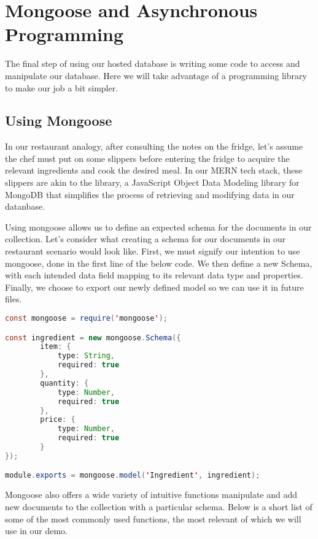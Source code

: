 \section{Mongoose and Asynchronous Programming}

The final step of using our hosted database is writing some code to access and manipulate our database. Here we will take advantage of a programming library to make our job a bit simpler. 

\subsection*{Using Mongoose}

In our restaurant analogy, after consulting the notes on the fridge, let's assume the chef must put on some slippers before entering the fridge to acquire the relevant ingredients and cook the desired meal. In our MERN tech stack, these slippers are akin to the  library, a JavaScript Object Data Modeling library for MongoDB that simplifies the process of retrieving and modifying data in our datanbase. 

Using mongoose allows us to define an expected schema for the documents in our collection. Let's consider what creating a schema for our documents in our restaurant scenario would look like. First, we must signify our intention to use mongoose, done in the first line of the below code. We then define a new Schema, with each intended data field mapping to its relevant data type and properties. Finally, we choose to export our newly defined model so we can use it in future files.

\vspace{.5cm}

\begin{lstlisting}[language=Java]
const mongoose = require('mongoose');

const ingredient = new mongoose.Schema({
        item: {
            type: String,
            required: true
        },
        quantity: {
            type: Number,
            required: true
        },
        price: {
            type: Number,
            required: true
        }
});

module.exports = mongoose.model('Ingredient', ingredient);
\end{lstlisting}

Mongoose also offers a wide variety of intuitive functions manipulate and add new documents to the collection with a particular schema. Below is a short list of some of the most commonly used functions, the most relevant of which we will use in our demo.

